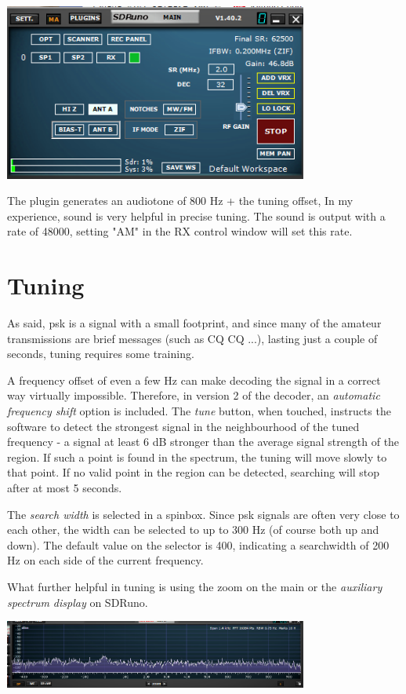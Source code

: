 \documentclass[11pt]{article}
\begin{document}
\includegraphics[width=100mm]{main-widget.png}

The plugin generates an audiotone of 800 Hz + the tuning offset,
In my experience, sound is very helpful in precise tuning.
The sound is output with a rate of 48000, setting "AM" in the RX control window
will set this rate.

\section{Tuning}
As said, psk is a signal with a small footprint, and since many of
the amateur transmissions are brief messages (such as CQ CQ ...),
lasting just a couple of seconds, tuning requires some training.
\par
A frequency offset of even a few Hz can make decoding the signal in a
correct way virtually impossible.
Therefore, in version 2 of the decoder, an
{\em automatic frequency shift} option is included.
The {\em tune} button, when touched, instructs the software to detect
the strongest signal in the
neighbourhood of the tuned frequency - a signal at least 6 dB stronger
than the average signal strength of the region.
If such a point is found in the spectrum, the tuning will move slowly to
that point.
If no valid point in the region can be detected, searching will stop
after at most 5 seconds.
\par
The {\em search width} is selected in a spinbox. Since psk signals
are often very close to each other, the width can be selected to up to
300 Hz (of course both up and down). The default value on the selector is
400, indicating a searchwidth of 200 Hz on each side of the current frequency.

\par
What further helpful  in tuning is using the zoom on the main or the
 {\em auxiliary spectrum display} on 
SDRuno.

\includegraphics[width=100mm]{auxiliary-spectrum-display.png}
\end{document}
